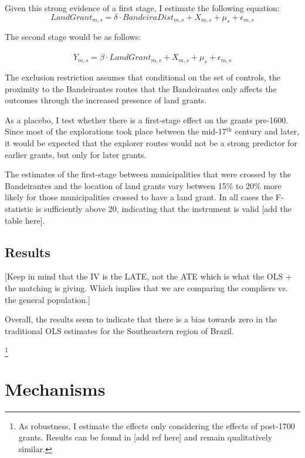 \documentclass{article}
\begin{document}
Given this strong evidence of a first stage, I estimate the following equation:
\begin{equation}
  \label{eqn:firststage}
  LandGrant_{m,s} = \delta \cdot BandeiraDist_{m,s} +  X_{m,s} + \mu_s  + \epsilon_{m,s}
\end{equation}

The second stage would be as follows:

\begin{equation}
  \label{eqn:ivequation}
  Y_{m,s} = \beta \cdot \widehat{LandGrant}_{m,s} + X_{m,s} + \mu_s +  \epsilon_{m,s}
\end{equation}

The exclusion restriction assumes that conditional on the set of controls, the proximity to the Bandeirantes routes that the Bandeirantes only affects the outcomes through the increased presence of land grants.


As a placebo, I test whether there is a first-stage effect on the grants pre-1600. 
Since most of the explorations took place between the mid-17$^\text{th}$ century and later, it would be expected that the explorer routes would not be a strong predictor for earlier grants, but only for later grants.


The estimates of the first-stage between municipalities that were crossed by the Bandeirantes and the location of land grants vary between 15\% to 20\% more likely for those municipalities crossed to have a land grant. 
In all cases the F-statistic is sufficiently above 20, indicating that the instrument is valid [add the table here]. 

\subsection{Results}

[Keep in mind that the IV is the LATE, not the ATE which is what the OLS + the matching is giving. Which implies that we are comparing the compliers vs. the general population.]

Overall, the results seem to indicate that there is a bias towards zero in the traditional OLS estimates for the Southeastern region of Brazil.

\footnote{As robustness, I estimate the effects only considering the effects of post-1700 grants. Results can be found in [add ref here] and remain qualitatively similar.}

\section{Mechanisms}
\end{document}

